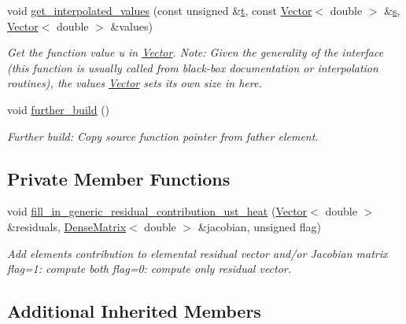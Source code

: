 \begin{DoxyCompactItemize}
void \hyperlink{classoomph_1_1RefineableUnsteadyHeatEquations_a661820fcf2bd6518717ec8d81649a8d7}{get\+\_\+interpolated\+\_\+values} (const unsigned \&\hyperlink{cfortran_8h_af6f0bd3dc13317f895c91323c25c2b8f}{t}, const \hyperlink{classoomph_1_1Vector}{Vector}$<$ double $>$ \&\hyperlink{cfortran_8h_ab7123126e4885ef647dd9c6e3807a21c}{s}, \hyperlink{classoomph_1_1Vector}{Vector}$<$ double $>$ \&values)
\begin{DoxyCompactList}\small\item\em Get the function value u in \hyperlink{classoomph_1_1Vector}{Vector}. Note\+: Given the generality of the interface (this function is usually called from black-\/box documentation or interpolation routines), the values \hyperlink{classoomph_1_1Vector}{Vector} sets its own size in here. \end{DoxyCompactList}\item 
void \hyperlink{classoomph_1_1RefineableUnsteadyHeatEquations_ae39fad9e49a9fa1353c016633f66dc7d}{further\+\_\+build} ()
\begin{DoxyCompactList}\small\item\em Further build\+: Copy source function pointer from father element. \end{DoxyCompactList}\end{DoxyCompactItemize}
\subsection*{Private Member Functions}
\begin{DoxyCompactItemize}
\item 
void \hyperlink{classoomph_1_1RefineableUnsteadyHeatEquations_a06043cae80b1b6091b5914f41ffba16e}{fill\+\_\+in\+\_\+generic\+\_\+residual\+\_\+contribution\+\_\+ust\+\_\+heat} (\hyperlink{classoomph_1_1Vector}{Vector}$<$ double $>$ \&residuals, \hyperlink{classoomph_1_1DenseMatrix}{Dense\+Matrix}$<$ double $>$ \&jacobian, unsigned flag)
\begin{DoxyCompactList}\small\item\em Add element\textquotesingle{}s contribution to elemental residual vector and/or Jacobian matrix flag=1\+: compute both flag=0\+: compute only residual vector. \end{DoxyCompactList}\end{DoxyCompactItemize}
\subsection*{Additional Inherited Members}


